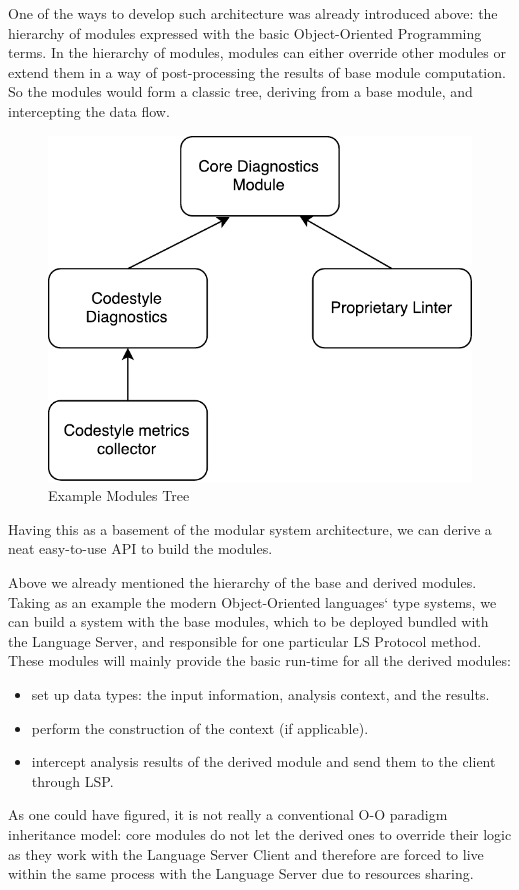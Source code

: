 One of the ways to develop such architecture was already introduced above: the hierarchy of modules expressed with the basic Object-Oriented Programming terms. In the hierarchy of modules,
modules can either override other modules or extend them in a way of post-processing the
results of base module computation. So the modules would form a classic tree, deriving from a base module,
and intercepting the data flow.

\begin{figure}[H]
    \centering
    \includegraphics[width=.5\textwidth]{figs/module_tree.pdf}
    \caption{Example Modules Tree}
\end{figure}

Having this as a basement of the modular system architecture, we can derive a 
neat easy-to-use API to build the modules.

Above we already mentioned the hierarchy of the base and derived modules. Taking as an example the modern Object-Oriented languages` 
type systems, we can build a system with the base modules, which to be deployed bundled with the Language Server, and responsible for
one particular LS Protocol method. These modules will mainly provide the basic run-time for all the derived modules: 
\begin{itemize}
    \item set up data types: the input information, analysis context, and the results.  
    \item perform the construction of the context (if applicable).
    \item intercept analysis results of the derived module and send them to the client through LSP.
\end{itemize}

As one could have figured, it is not really a conventional O-O paradigm inheritance model: core modules do not let the derived ones to override their logic as they work with the Language Server Client and therefore
are forced to live within the same process with the Language Server due to resources sharing. 

